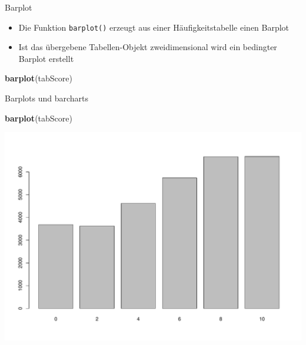 \documentclass[ignorenonframetext,]{beamer}
\newenvironment{Shaded}{}{}
\newcommand{\KeywordTok}[1]{\textcolor[rgb]{0.00,0.44,0.13}{\textbf{{#1}}}}
\newcommand{\StringTok}[1]{\textcolor[rgb]{0.25,0.44,0.63}{{#1}}}
\newcommand{\NormalTok}[1]{{#1}}
\providecommand{\tightlist}{%
\setlength{\itemsep}{0pt}\setlength{\parskip}{0pt}}
\begin{document}
\begin{frame}[fragile]{Barplot}

\begin{itemize}
\tightlist
\item
  Die Funktion \texttt{barplot()} erzeugt aus einer Häufigkeitstabelle
  einen Barplot
\item
  Ist das übergebene Tabellen-Objekt zweidimensional wird ein bedingter
  Barplot erstellt
\end{itemize}

\begin{Shaded}
\end{Shaded}

\begin{Shaded}
\begin{Highlighting}[]
\KeywordTok{barplot}\NormalTok{(tabScore)}
\end{Highlighting}
\end{Shaded}

\end{frame}

\begin{frame}[fragile]{Barplots und barcharts}

\begin{Shaded}
\begin{Highlighting}[]
\KeywordTok{barplot}\NormalTok{(tabScore)}
\end{Highlighting}
\end{Shaded}

\includegraphics{R_intern_files/figure-beamer/unnamed-chunk-204-1.pdf}

\end{frame}
\end{document}
